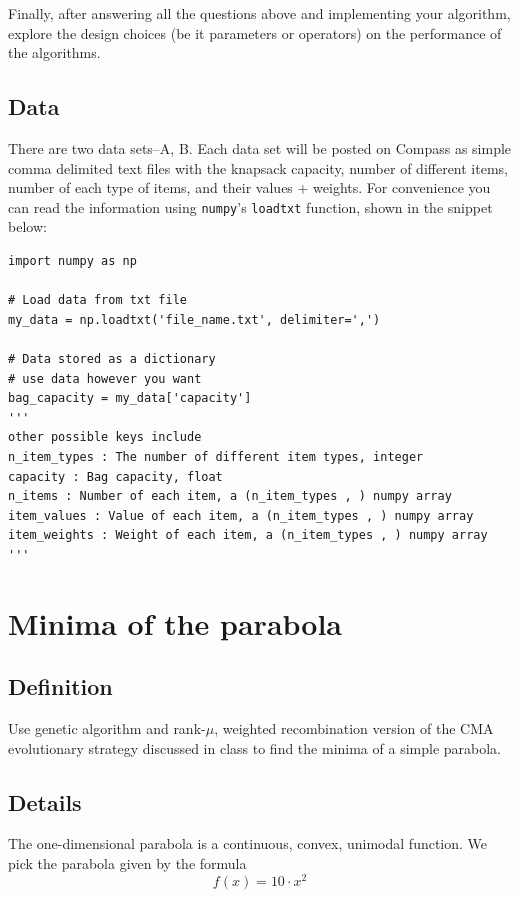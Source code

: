\documentclass[11pt]{article}
\begin{document}
Finally, after answering all the questions above and implementing your
algorithm, explore the design choices (be it parameters or operators) on the
performance of the algorithms.
\subsection{Data}
\label{sec:data}
There are two data sets--A, B. Each data set will be posted on Compass as simple
comma delimited text files with the knapsack capacity, number of different
items, number of each type of items, and their values + weights. For
convenience you can read the information using \texttt{numpy}'s \texttt{loadtxt} function,
shown in the snippet below:

\begin{verbatim}
import numpy as np

# Load data from txt file
my_data = np.loadtxt('file_name.txt', delimiter=',')

# Data stored as a dictionary
# use data however you want
bag_capacity = my_data['capacity']
'''
other possible keys include
n_item_types : The number of different item types, integer
capacity : Bag capacity, float
n_items : Number of each item, a (n_item_types , ) numpy array
item_values : Value of each item, a (n_item_types , ) numpy array
item_weights : Weight of each item, a (n_item_types , ) numpy array
'''

\end{verbatim}

\section{Minima of the parabola}
\label{sec:org850c949}
\subsection{Definition}
\label{sec:org4aac5bc}
  Use genetic algorithm and rank-\(\mu\), weighted recombination version of the CMA
evolutionary strategy discussed in class to find the minima of a simple parabola.
\subsection{Details}
\label{sec:orgbda2117}
The one-dimensional parabola is a continuous, convex, unimodal function. We
pick the parabola given by the formula
\begin{equation}
f(x) = 10 \cdot x^2
\end{equation}
\end{document}
